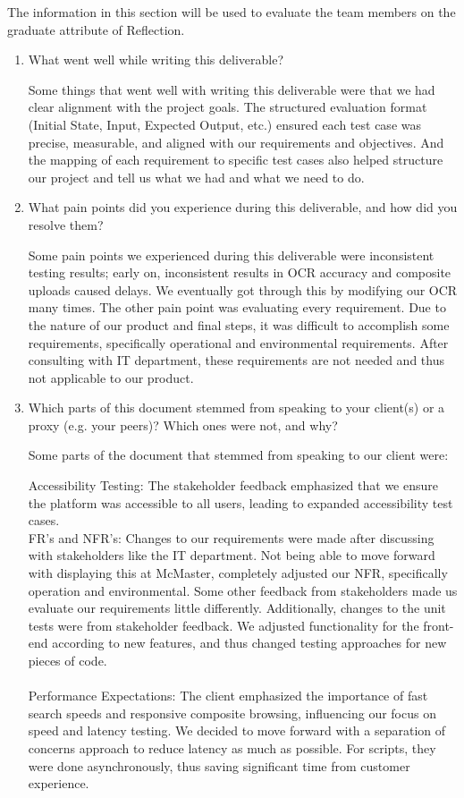 \documentclass[12pt, titlepage]{article}
\begin{document}
The information in this section will be used to evaluate the team members on the
graduate attribute of Reflection.



\begin{enumerate}
  \item What went well while writing this deliverable?

 Some things that went well with writing this deliverable were that we had clear alignment with the project goals. The structured evaluation format (Initial State, Input, Expected Output, etc.) ensured each test case was precise, measurable, and aligned with our requirements and objectives. And the mapping of each requirement to specific test cases also helped structure our project and tell us what we had and what we need to do.
  
  \item What pain points did you experience during this deliverable, and how
    did you resolve them?

    Some pain points we experienced during this deliverable were inconsistent testing results; early on, inconsistent results in OCR accuracy and composite uploads caused delays. We eventually got through this by modifying our OCR many times. The other pain point was evaluating every requirement. Due to the nature of our product and final steps, it was difficult to accomplish some requirements, specifically operational and environmental requirements. After consulting with IT department, these requirements are not needed and thus not applicable to our product.

  \item Which parts of this document stemmed from speaking to your client(s) or
  a proxy (e.g. your peers)? Which ones were not, and why?
  
  Some parts of the document that stemmed from speaking to our client were:
  
  Accessibility Testing: The stakeholder feedback emphasized that we ensure the platform was accessible to all users, leading to expanded accessibility test cases.\\
  
FR’s and NFR’s: Changes to our requirements were made after discussing with stakeholders like the IT department. Not being able to move forward with displaying this at McMaster, completely adjusted our NFR, specifically operation and environmental. Some other feedback from stakeholders made us evaluate our requirements little differently. Additionally, changes to the unit tests were from stakeholder feedback. We adjusted functionality for the front-end according to new features, and thus changed testing approaches for new pieces of code.\\
\\Performance Expectations: The client emphasized the importance of fast search speeds and responsive composite browsing, influencing our focus on speed and latency testing. We decided to move forward with a separation of concerns approach to reduce latency as much as possible. For scripts, they were done asynchronously, thus saving significant time from customer experience.\\


\end{enumerate}
\end{document}
